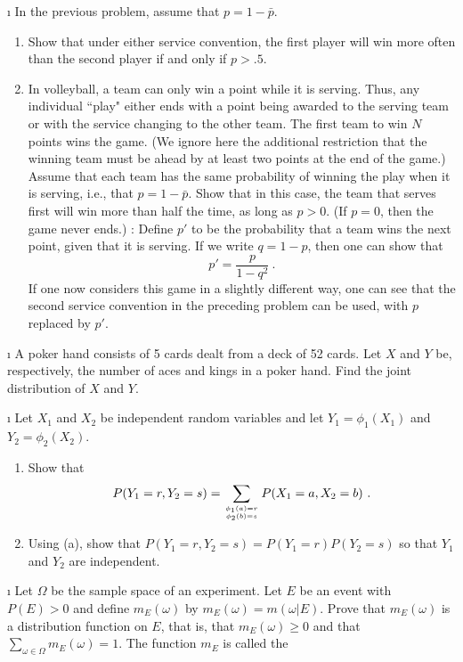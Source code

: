 \begin{LJSItem}
\i\label{exer 5.1.15.5}
In the previous problem, assume that $p = 1 - \bar{p}$.
\begin{enumerate}
\item  Show that under either service convention, the first player will win more often than the second
player if and only if $p > .5$.
\item
In volleyball, a team can only win a point while it is serving.  Thus, any
individual ``play" either ends with a point being awarded to the serving team or with the service
changing to the other team.  The first team to win $N$ points wins the game.  (We ignore here the 
additional restriction that the winning team must be ahead by at least two points at the end of the
game.)  Assume that each team has the same probability of winning the play when it is serving, i.e., 
that $p = 1 - \bar{p}$.  Show that in this case, the team that serves first will win more than half the
time, as long as $p > 0$.  (If $p = 0$, then the game never ends.)  : Define $p'$ to be
the probability that a team wins the next point, given that it is serving.  If we write $q = 1 -
p$, then one can show that 
$$p' = \frac p{1-q^2}\ .$$
If one now considers this game in a slightly different way, one can see that the second service
convention in the preceding problem can be used, with $p$ replaced by $p'$.
\end{enumerate} 

\i\label{exer 5.1.19} A poker hand consists of 5 cards dealt from a deck of 52 cards.  Let $X$
and $Y$ be, respectively, the number of aces and kings in a poker hand.  Find the joint
distribution of $X$ and $Y$.

\i\label{exer 5.1.24.5} Let $X_1$ and $X_2$ be independent random variables and let $Y_1 =
\phi_1(X_1)$ and $Y_2 = \phi_2(X_2)$.
\begin{enumerate}

\item Show that
$$ P(Y_1 = r, Y_2 = s) = \sum_{\phi_1(a) = r \atop \phi_2(b) = s} P(X_1 = a, X_2 = b)\ .
$$

\item Using (a), show that $P(Y_1 = r, Y_2 = s) = P(Y_1 = r)P(Y_2 = s)$ so that $Y_1$ and
$Y_2$ are independent.
\end{enumerate}

\i\label{exer 4.1.32} Let $\Omega$ be the sample space of an experiment.  Let $E$ be an
event with $P(E) > 0$ and define $m_E(\omega)$ by
$m_E(\omega) = m(\omega|E)$.  Prove that $m_E(\omega)$ is a distribution function on
$E$, that is, that $m_E(\omega) \geq 0$ and that $\sum_{\omega\in\Omega}
m_E(\omega) = 1$.  The function $m_E$ is called the 


\end{LJSItem}
